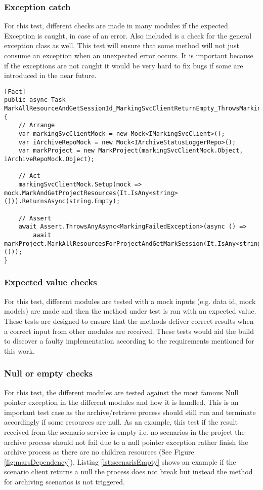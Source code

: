 \subsubsection{Exception catch}
For this test, different checks are made in many modules if the expected Exception is caught, in case of an error. Also included is a check for the general
exception class as well. This test will ensure that some method will not just consume an exception when an unexpected error occurs. It is important because if 
the exceptions are not caught it would be very hard to fix bugs if some are introduced in the near future.

\newpage
\begin{lstlisting}[language={[Sharp]C}, caption={Exception catch test example}, captionpos=b,label={lst:exceptionCatch}]
[Fact]
public async Task MarkAllResourceAndGetSessionId_MarkingSvcClientReturnEmpty_ThrowsMarkingFailedException()
{
    // Arrange
    var markingSvcClientMock = new Mock<IMarkingSvcClient>();
    var iArchiveRepoMock = new Mock<IArchiveStatusLoggerRepo>();
    var markProject = new MarkProject(markingSvcClientMock.Object, iArchiveRepoMock.Object);
    
    // Act 
    markingSvcClientMock.Setup(mock => mock.MarkAndGetProjectResources(It.IsAny<string>())).ReturnsAsync(string.Empty);
    
    // Assert
    await Assert.ThrowsAnyAsync<MarkingFailedException>(async () =>
        await markProject.MarkAllResourcesForProjectAndGetMarkSession(It.IsAny<string>()));
}
\end{lstlisting}

\subsubsection{Expected value checks}
For this test, different modules are tested with a mock inputs (e.g. data id, mock models) are made and then the method under test is ran with an 
expected value. These tests are designed to ensure that the methods deliver correct results when a correct input from other modules are received.
These tests would aid the build to discover a faulty implementation according to the requirements mentioned for this work.

\subsubsection{Null or empty checks}
For this test, the different modules are tested against the most famous Null pointer exception in the different modules and how it is handled. This is an important
test case as the archive/retrieve process should still run and terminate accordingly if some resources are null. As an example, this test if the result received from
the scenario service  is empty i.e. no scenarios in the project the archive process should not fail due to a null pointer exception rather finish the archive process
as there are no children resources (See Figure \ref{fig:marsDependency}). Listing \ref{lst:scenarisEmpty} shows an example if the scenario client returns a null 
the process does not break but instead the method for archiving scenarios is not triggered. 

